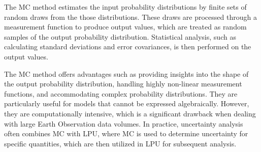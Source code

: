 The \ac{MC} method estimates the input probability distributions by finite sets
of random draws from the those distributions. These draws are processed
through a measurement function to produce output values, which are treated as
random samples of the output probability distribution. Statistical analysis,
such as calculating standard deviations and error covariances, is then
performed on the output values. 

The \ac{MC} method offers advantages such as providing insights into the shape
of the output probability distribution, handling highly non-linear measurement
functions, and accommodating complex probability distributions. They are
particularly useful for models that cannot be expressed algebraically. However,
they are computationally intensive, which is a significant drawback when
dealing with large Earth Observation data volumes. In practice, uncertainty
analysis often combines \ac{MC} with \ac{LPU}, where \ac{MC} is used to
determine uncertainty for specific quantities, which are then utilized in
\ac{LPU} for subsequent analysis.
